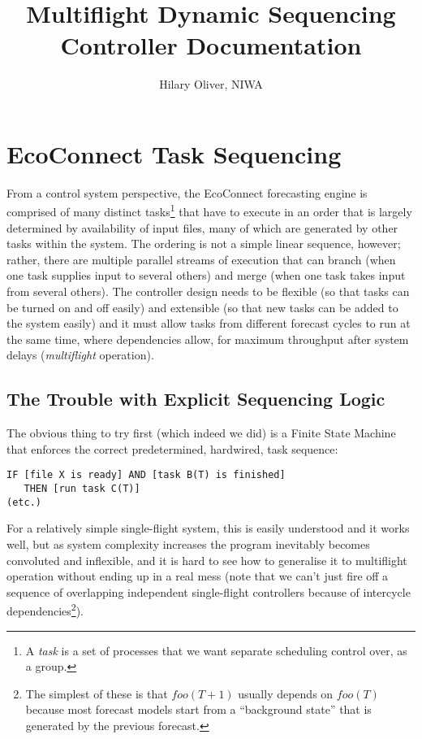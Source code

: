 \documentclass[12pt]{amsart}
\title{Multiflight Dynamic Sequencing Controller Documentation}
\author{Hilary Oliver, NIWA}
\begin{document}
\maketitle

\section{EcoConnect Task Sequencing} 

From a control system perspective, the EcoConnect forecasting engine is
comprised of many distinct tasks\footnote{A {\em task} is a set of
processes that we want separate scheduling control over, as a group.}
that have to execute in an order that is largely determined by
availability of input files, many of which are generated by other tasks
within the system.  The ordering is not a simple linear sequence,
however; rather, there are multiple parallel streams of execution that
can branch (when one task supplies input to several others) and merge
(when one task takes input from several others). The controller design
needs to be flexible (so that tasks can be turned on and off easily) and
extensible (so that new tasks can be added to the system easily) and it
must allow tasks from different forecast cycles to run at the same time,
where dependencies allow, for maximum throughput after system delays
({\em multiflight} operation). 


\subsection{The Trouble with Explicit Sequencing Logic}

The obvious thing to try first (which indeed we did) is a Finite State
Machine that enforces the correct predetermined, hardwired, task
sequence: 

\begin{verbatim}
IF [file X is ready] AND [task B(T) is finished]
   THEN [run task C(T)] 
(etc.)
\end{verbatim} 

For a relatively simple single-flight system, this is easily understood
and it works well, but as system complexity increases the program
inevitably becomes convoluted and inflexible, and it is hard to see how
to generalise it to multiflight operation without ending up in a real
mess (note that we can't just fire off a sequence of overlapping
independent single-flight controllers because of intercycle
dependencies\footnote{The simplest of these is that $foo(T+1)$ usually
depends on $foo(T)$ because most forecast models start from a
``background state'' that is generated by the previous forecast.}). 
\end{document}

